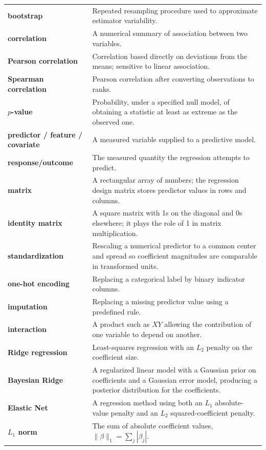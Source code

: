 \documentclass[11pt]{article}
\begin{document}
\begin{longtable}{p{}p{}}
\textbf{bootstrap} & Repeated resampling procedure used to approximate estimator variability.\\
\textbf{correlation} & A numerical summary of association between two variables.\\
\textbf{Pearson correlation} & Correlation based directly on deviations from the means; sensitive to linear association.\\
\textbf{Spearman correlation} & Pearson correlation after converting observations to ranks.\\
\textbf{$p$-value} & Probability, under a specified null model, of obtaining a statistic at least as extreme as the observed one.\\
\textbf{predictor / feature / covariate} & A measured variable supplied to a predictive model.\\
\textbf{response/outcome} & The measured quantity the regression attempts to predict.\\
\textbf{matrix} & A rectangular array of numbers; the regression design matrix stores predictor values in rows and columns.\\
\textbf{identity matrix} & A square matrix with 1s on the diagonal and 0s elsewhere; it plays the role of 1 in matrix multiplication.\\
\textbf{standardization} & Rescaling a numerical predictor to a common center and spread so coefficient magnitudes are comparable in transformed units.\\
\textbf{one-hot encoding} & Replacing a categorical label by binary indicator columns.\\
\textbf{imputation} & Replacing a missing predictor value using a predefined rule.\\
\textbf{interaction} & A product such as $XY$ allowing the contribution of one variable to depend on another.\\
\textbf{Ridge regression} & Least-squares regression with an $L_2$ penalty on the coefficient size.\\
\textbf{Bayesian Ridge} & A regularized linear model with a Gaussian prior on coefficients and a Gaussian error model, producing a posterior distribution for the coefficients.\\
\textbf{Elastic Net} & A regression method using both an $L_1$ absolute-value penalty and an $L_2$ squared-coefficient penalty.\\
\textbf{$L_1$ norm} & The sum of absolute coefficient values, $\|\beta\|_1=\sum_j|\beta_j|$.\\

\end{longtable}
\end{document}

